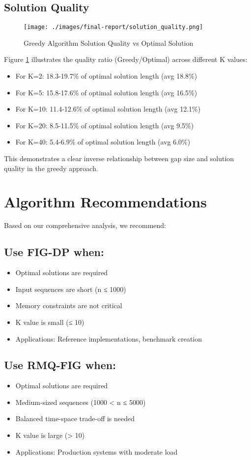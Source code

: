 \documentclass[12pt]{article}
\begin{document}
\subsection{Solution Quality}
\begin{figure}[H]
    \centering
    \texttt{[image: ./images/final-report/solution\_quality.png]}
    \caption{Greedy Algorithm Solution Quality vs Optimal Solution}
    \label{fig:solution_quality}
\end{figure}

Figure \ref{fig:solution_quality} illustrates the quality ratio (Greedy/Optimal) across different K values:
\begin{itemize}
    \item For K=2: 18.3-19.7\% of optimal solution length (avg 18.8\%)
    \item For K=5: 15.8-17.6\% of optimal solution length (avg 16.5\%)
    \item For K=10: 11.4-12.6\% of optimal solution length (avg 12.1\%)
    \item For K=20: 8.5-11.5\% of optimal solution length (avg 9.5\%)
    \item For K=40: 5.4-6.9\% of optimal solution length (avg 6.0\%)
\end{itemize}

This demonstrates a clear inverse relationship between gap size and solution quality in the greedy approach.

\section{Algorithm Recommendations}
Based on our comprehensive analysis, we recommend:

\subsection{Use FIG-DP when:}
\begin{itemize}
    \item Optimal solutions are required
    \item Input sequences are short (n ≤ 1000)
    \item Memory constraints are not critical
    \item K value is small (≤ 10)
    \item Applications: Reference implementations, benchmark creation
\end{itemize}

\subsection{Use RMQ-FIG when:}
\begin{itemize}
    \item Optimal solutions are required
    \item Medium-sized sequences (1000 < n ≤ 5000)
    \item Balanced time-space trade-off is needed
    \item K value is large (> 10)
    \item Applications: Production systems with moderate load
\end{itemize}
\end{document}
